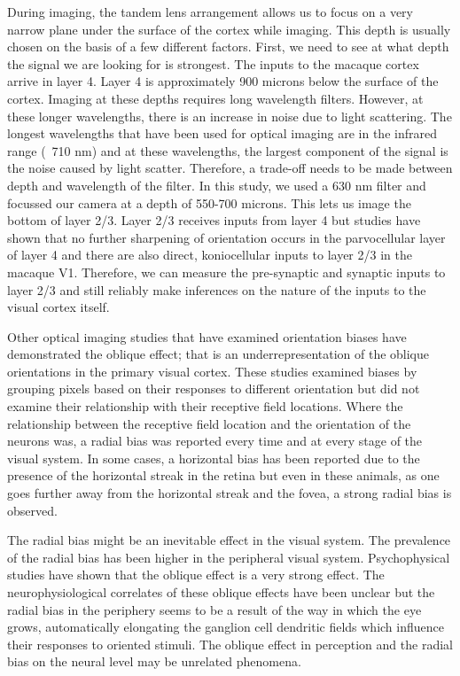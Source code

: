 		
		During imaging, the tandem lens arrangement allows us to focus on a very narrow plane under the surface of the cortex while imaging. This depth is usually chosen on the basis of a few different factors. First, we need to see at what depth the signal we are looking for is strongest. The inputs to the macaque cortex arrive in layer 4. Layer 4 is approximately 900 microns below the surface of the cortex. Imaging at these depths requires long wavelength filters. However, at these longer wavelengths, there is an increase in noise due to light scattering. The longest wavelengths that have been used for optical imaging are in the infrared range (~710 nm) and at these wavelengths, the largest component of the signal is the noise caused by light scatter. Therefore, a trade-off needs to be made between depth and wavelength of the filter. In this study, we used a 630 nm filter and focussed our camera at a depth of 550-700 microns. This lets us image the bottom of layer 2/3. Layer 2/3 receives inputs from layer 4 but studies have shown that no further sharpening of orientation occurs in the parvocellular layer of layer 4 and there are also direct, koniocellular inputs to layer 2/3 in the macaque V1. Therefore, we can measure the pre-synaptic and synaptic inputs to layer 2/3 and still reliably make inferences on the nature of the inputs to the visual cortex itself.
		
		
		Other optical imaging studies that have examined orientation biases have demonstrated the oblique effect; that is an underrepresentation of the oblique orientations in the primary visual cortex.  These studies examined biases by grouping pixels based on their responses to different orientation but did not examine their relationship with their receptive field locations. Where the relationship between the receptive field location and the orientation of the neurons was, a radial bias was reported every time and at every stage of the visual system. In some cases, a horizontal bias has been reported due to the presence of the horizontal streak in the retina but even in these animals, as one goes further away from the horizontal streak and the fovea, a strong radial bias is observed.
		
		
		The radial bias might be an inevitable effect in the visual system. The prevalence of the radial bias has been higher in the peripheral visual system. Psychophysical studies have shown that the oblique effect is a very strong effect. The neurophysiological correlates of these oblique effects have been unclear but the radial bias in the periphery seems to be a result of the way in which the eye grows, automatically elongating the ganglion cell dendritic fields which influence their responses to oriented stimuli. The oblique effect in perception and the radial bias on the neural level may be unrelated phenomena.
	
